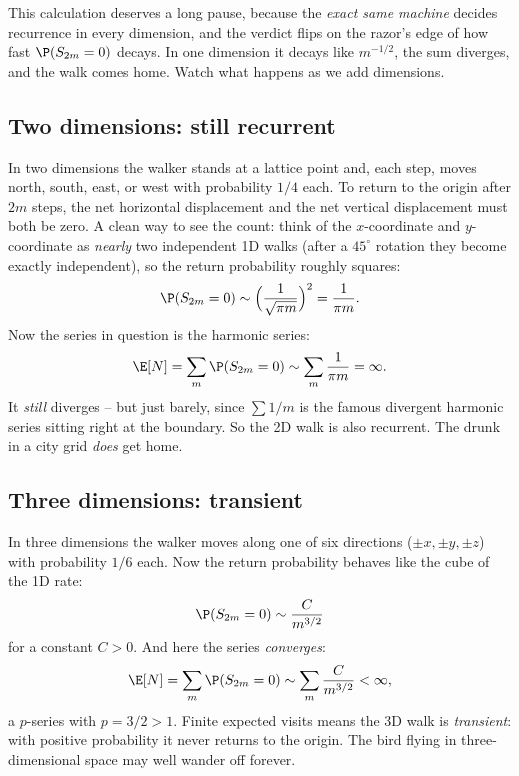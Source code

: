 This calculation deserves a long pause, because the \emph{exact same machine}
decides recurrence in every dimension, and the verdict flips on the razor's
edge of how fast $\P(S_{2m}=0)$ decays. In one dimension it decays like
$m^{-1/2}$, the sum diverges, and the walk comes home. Watch what happens as we
add dimensions.

\subsection{Two dimensions: still recurrent}

In two dimensions the walker stands at a lattice point and, each step, moves
north, south, east, or west with probability $1/4$ each. To return to the
origin after $2m$ steps, the net horizontal displacement and the net vertical
displacement must both be zero. A clean way to see the count: think of the
$x$-coordinate and $y$-coordinate as \emph{nearly} two independent 1D walks
(after a $45^\circ$ rotation they become exactly independent), so the return
probability roughly squares:
\[
  \P(S_{2m} = 0) \sim \Big(\frac{1}{\sqrt{\pi m}}\Big)^2 = \frac{1}{\pi m}.
\]
Now the series in question is the harmonic series:
\[
  \E[N] = \sum_m \P(S_{2m}=0) \sim \sum_m \frac{1}{\pi m} = \infty.
\]
It \emph{still} diverges -- but just barely, since $\sum 1/m$ is the famous
divergent harmonic series sitting right at the boundary. So the 2D walk is also
recurrent. The drunk in a city grid \emph{does} get home.

\subsection{Three dimensions: transient}

In three dimensions the walker moves along one of six directions
($\pm x, \pm y, \pm z$) with probability $1/6$ each. Now the return probability
behaves like the cube of the 1D rate:
\[
  \P(S_{2m} = 0) \sim \frac{C}{m^{3/2}}
\]
for a constant $C > 0$. And here the series \emph{converges}:
\[
  \E[N] = \sum_m \P(S_{2m}=0) \sim \sum_m \frac{C}{m^{3/2}} < \infty,
\]
a $p$-series with $p = 3/2 > 1$. Finite expected visits means the 3D walk is
\emph{transient}: with positive probability it never returns to the origin.
The bird flying in three-dimensional space may well wander off forever.


